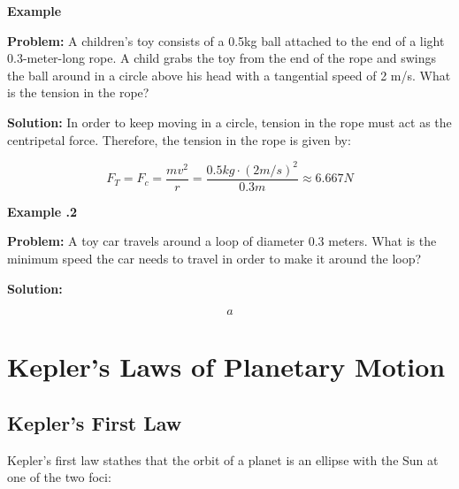 	
	\begin{mdframed}[backgroundcolor=blue!10!white]
		\begin{center}
			\textbf{Example \thesubsection}
		\end{center}
		\textbf{Problem:} A children's toy consists of a 0.5kg ball attached to the end of a light 0.3-meter-long rope.  A child grabs the toy from the end of the rope and swings the ball around in a circle above his head with a tangential speed of 2 m/s.  What is the tension in the rope? 
		
		\vspace{0.1in}
		
		\textbf{Solution:} In order to keep moving in a circle, tension in the rope must act as the centripetal force.  Therefore, the tension in the rope is given by:
	
		\begin{equation*}
			F_T = F_c = \frac{mv^2}{r} = \frac{0.5 kg \cdot (2 m/s )^2}{0.3m} \approx \boxed{6.667 N}
		\end{equation*}
		
		\end{mdframed}
	
	
		\begin{mdframed}[backgroundcolor=blue!10!white]
		\begin{center}
			\textbf{Example \thesubsection.2}
		\end{center}
		\textbf{Problem:} A toy car travels around a loop of diameter 0.3 meters.  What is the minimum speed the car needs to travel in order to make it around the loop?
		
		\vspace{0.1in}
		
		\textbf{Solution:} 
		
		\begin{equation*}
		a
		\end{equation*}
		
	\end{mdframed}
	
	
	
	\section{Kepler's Laws of Planetary Motion}  
	\subsection{Kepler's First Law}
	    Kepler's first law stathes that the orbit of a planet is an ellipse with the Sun at one of the two foci:
	    


